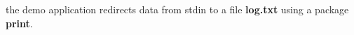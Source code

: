 \href{https://travis-ci.org/kit10000000/lab10}{\tt } the demo application redirects data from stdin to a file {\bfseries log.\+txt} using a package {\bfseries print}. 